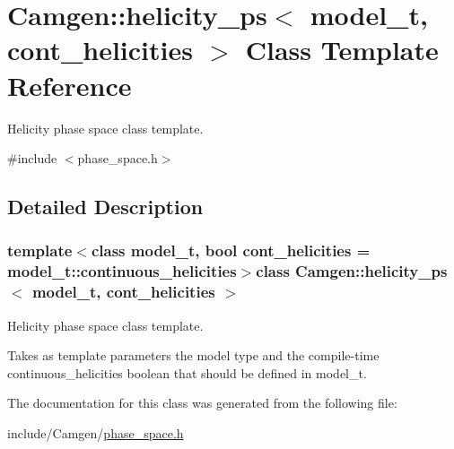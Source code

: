 \hypertarget{a00276}{}\section{Camgen\+:\+:helicity\+\_\+ps$<$ model\+\_\+t, cont\+\_\+helicities $>$ Class Template Reference}
\label{a00276}


Helicity phase space class template.  




{\ttfamily \#include $<$phase\+\_\+space.\+h$>$}



\subsection{Detailed Description}
\subsubsection*{template$<$class model\+\_\+t, bool cont\+\_\+helicities = model\+\_\+t\+::continuous\+\_\+helicities$>$class Camgen\+::helicity\+\_\+ps$<$ model\+\_\+t, cont\+\_\+helicities $>$}

Helicity phase space class template. 

Takes as template parameters the model type and the compile-\/time continuous\+\_\+helicities boolean that should be defined in model\+\_\+t. 

The documentation for this class was generated from the following file\+:\begin{DoxyCompactItemize}
\item 
include/\+Camgen/\hyperlink{a00718}{phase\+\_\+space.\+h}\end{DoxyCompactItemize}
